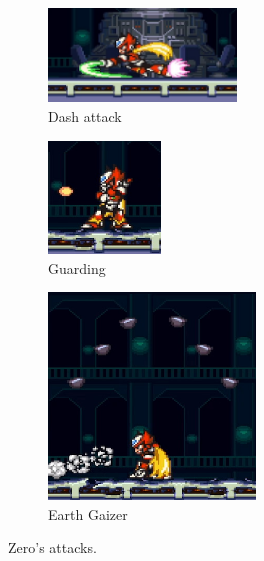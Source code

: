 \begin{figure}
	\ContinuedFloat
	\centering
	\begin{minipage}{.4\linewidth}
		\begin{subfigure}{\linewidth}
			\centering
			\includegraphics[height=2.5cm]{figures/X2/Hunter_stages/Zero_dash.png}
			\caption{Dash attack}
		\end{subfigure}	
		\begin{subfigure}{\linewidth}
			\centering
			\includegraphics[height=3cm]{figures/X2/Hunter_stages/Zero_guard.png}
			\caption{Guarding}
		\end{subfigure}	
	\end{minipage}
	\begin{minipage}{.5\linewidth}
		\begin{subfigure}{\linewidth}
			\centering
			\includegraphics[height=5.5cm]{figures/X2/Hunter_stages/Zero_earth_gaizer.png}
			\caption{Earth Gaizer}
		\end{subfigure}	
	\end{minipage}
	
	\caption{Zero's attacks.}	
\end{figure}

